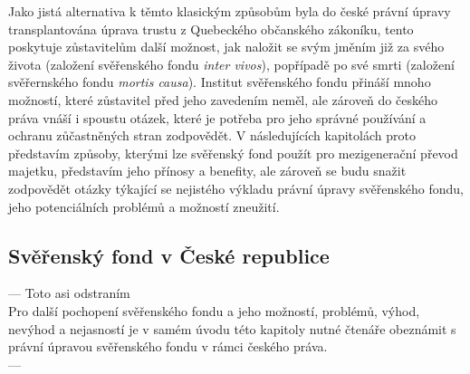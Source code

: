\documentclass{article}
\begin{document}
Jako jistá alternativa k těmto klasickým způsobům byla do české právní úpravy transplantována úprava trustu z Quebeckého občanského zákoníku, tento poskytuje zůstavitelům další možnost, jak naložit se svým jměním již za svého života (založení svěřenského fondu \textit{inter vivos}), popřípadě po své smrti (založení svěřernského fondu \textit{mortis causa}). Institut svěřenského fondu přináší mnoho možností, které zůstavitel před jeho zavedením neměl, ale zároveň do českého práva vnáší i spoustu otázek, které je potřeba pro jeho správné používání a ochranu zůčastněných stran zodpovědět. V následujících kapitolách proto představím způsoby, kterými lze svěřenský fond použít pro mezigenerační převod majetku, představím jeho přínosy a benefity, ale zároveň se budu snažit zodpovědět otázky týkající se nejistého výkladu právní úpravy svěřenského fondu, jeho potenciálních problémů a možností zneužití. \\

\newpage

\thispagestyle{smallertextinheader}

\subsection{Svěřenský fond v České republice}



--- Toto asi odstraním\\
Pro další pochopení svěřenského fondu a jeho možností, problémů, výhod, nevýhod a nejasností je v samém úvodu této kapitoly nutné čtenáře obeznámit s právní úpravou svěřenského fondu v rámci českého práva. \\
---\\
\end{document}

